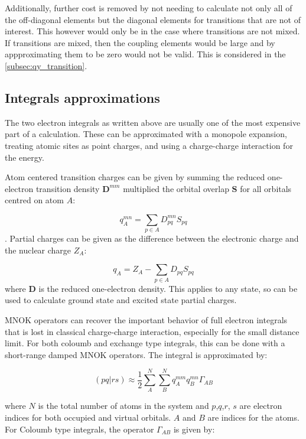 Additionally, further cost is removed by not needing
to calculate not only all of the off-diagonal elements but the diagonal elements 
for transitions that are not of interest. This however would only be in the case
where transitions are not mixed. If transitions are mixed, then the coupling elements
would be large and by appproximating them to be zero would not be valid. This is
considered in the \ref{subsec:qy_transition}.

\subsection{Integrals approximations}
\label{subsec:MNOK}

The two electron integrals as written above are usually one of the most expensive
part of a calculation. These can be approximated with a monopole expansion, treating
atomic sites as point charges, and using a charge-charge interaction for the energy.

Atom centered transition charges can be given by summing the reduced one-electron
transition density $\mathbf{D}^{mm}$ multiplied the orbital overlap $\mathbf{S}$
for all orbitals centred on atom $A$:

\begin{equation}
q^{mn}_A = \sum_{p \in A} D^{mn}_{pq} S_{pq}  
\end{equation}
%
. Partial charges can be given as the difference between the electronic charge
and the nuclear charge $Z_A$:

\begin{equation}
q_A = Z_A - \sum_{p \in A} D_{pq} S_{pq}  
\end{equation}
%
where $\mathbf{D}$ is the reduced one-electron density. This applies to any state,
so can be used to calculate ground state and excited state partial charges.

MNOK operators can recover the important behavior of full electron integrals that
is lost in classical charge-charge interaction, especially for the small distance limit.
For both coloumb and exchange type integrals, this can be done with a short-range
damped MNOK operators. The integral is approximated by:

\begin{equation}
\left(pq|rs\right) \approx \frac{1}{2}\sum^N_A \sum^N_B q_A^{mm} q_B^{mn} \Gamma_{AB}
\end{equation}

where $N$ is the total number of atoms in the system and $p$,$q$,$r$, $s$ are electron
indices for both occupied and virtual orbitals. $A$ and $B$ are indices for the atoms.
For Coloumb type integrals, the operator $\Gamma_{AB}$ is given by:


